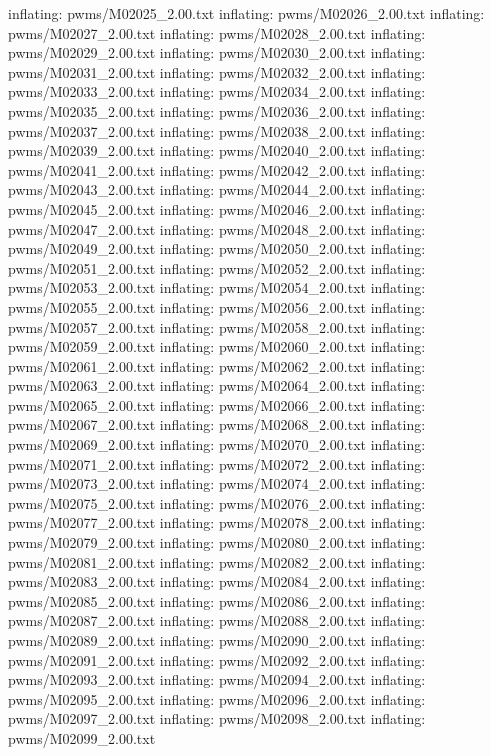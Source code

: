 \documentclass[letterpaper,10pt,english]{sphinxmanual}
\begin{document}
{\begin{sphinxVerbatim}[commandchars=\\\{\}]
  inflating: pwms/M02025\_2.00.txt
  inflating: pwms/M02026\_2.00.txt
  inflating: pwms/M02027\_2.00.txt
  inflating: pwms/M02028\_2.00.txt
  inflating: pwms/M02029\_2.00.txt
  inflating: pwms/M02030\_2.00.txt
  inflating: pwms/M02031\_2.00.txt
  inflating: pwms/M02032\_2.00.txt
  inflating: pwms/M02033\_2.00.txt
  inflating: pwms/M02034\_2.00.txt
  inflating: pwms/M02035\_2.00.txt
  inflating: pwms/M02036\_2.00.txt
  inflating: pwms/M02037\_2.00.txt
  inflating: pwms/M02038\_2.00.txt
  inflating: pwms/M02039\_2.00.txt
  inflating: pwms/M02040\_2.00.txt
  inflating: pwms/M02041\_2.00.txt
  inflating: pwms/M02042\_2.00.txt
  inflating: pwms/M02043\_2.00.txt
  inflating: pwms/M02044\_2.00.txt
  inflating: pwms/M02045\_2.00.txt
  inflating: pwms/M02046\_2.00.txt
  inflating: pwms/M02047\_2.00.txt
  inflating: pwms/M02048\_2.00.txt
  inflating: pwms/M02049\_2.00.txt
  inflating: pwms/M02050\_2.00.txt
  inflating: pwms/M02051\_2.00.txt
  inflating: pwms/M02052\_2.00.txt
  inflating: pwms/M02053\_2.00.txt
  inflating: pwms/M02054\_2.00.txt
  inflating: pwms/M02055\_2.00.txt
  inflating: pwms/M02056\_2.00.txt
  inflating: pwms/M02057\_2.00.txt
  inflating: pwms/M02058\_2.00.txt
  inflating: pwms/M02059\_2.00.txt
  inflating: pwms/M02060\_2.00.txt
  inflating: pwms/M02061\_2.00.txt
  inflating: pwms/M02062\_2.00.txt
  inflating: pwms/M02063\_2.00.txt
  inflating: pwms/M02064\_2.00.txt
  inflating: pwms/M02065\_2.00.txt
  inflating: pwms/M02066\_2.00.txt
  inflating: pwms/M02067\_2.00.txt
  inflating: pwms/M02068\_2.00.txt
  inflating: pwms/M02069\_2.00.txt
  inflating: pwms/M02070\_2.00.txt
  inflating: pwms/M02071\_2.00.txt
  inflating: pwms/M02072\_2.00.txt
  inflating: pwms/M02073\_2.00.txt
  inflating: pwms/M02074\_2.00.txt
  inflating: pwms/M02075\_2.00.txt
  inflating: pwms/M02076\_2.00.txt
  inflating: pwms/M02077\_2.00.txt
  inflating: pwms/M02078\_2.00.txt
  inflating: pwms/M02079\_2.00.txt
  inflating: pwms/M02080\_2.00.txt
  inflating: pwms/M02081\_2.00.txt
  inflating: pwms/M02082\_2.00.txt
  inflating: pwms/M02083\_2.00.txt
  inflating: pwms/M02084\_2.00.txt
  inflating: pwms/M02085\_2.00.txt
  inflating: pwms/M02086\_2.00.txt
  inflating: pwms/M02087\_2.00.txt
  inflating: pwms/M02088\_2.00.txt
  inflating: pwms/M02089\_2.00.txt
  inflating: pwms/M02090\_2.00.txt
  inflating: pwms/M02091\_2.00.txt
  inflating: pwms/M02092\_2.00.txt
  inflating: pwms/M02093\_2.00.txt
  inflating: pwms/M02094\_2.00.txt
  inflating: pwms/M02095\_2.00.txt
  inflating: pwms/M02096\_2.00.txt
  inflating: pwms/M02097\_2.00.txt
  inflating: pwms/M02098\_2.00.txt
  inflating: pwms/M02099\_2.00.txt

\end{sphinxVerbatim}}
\end{document}

